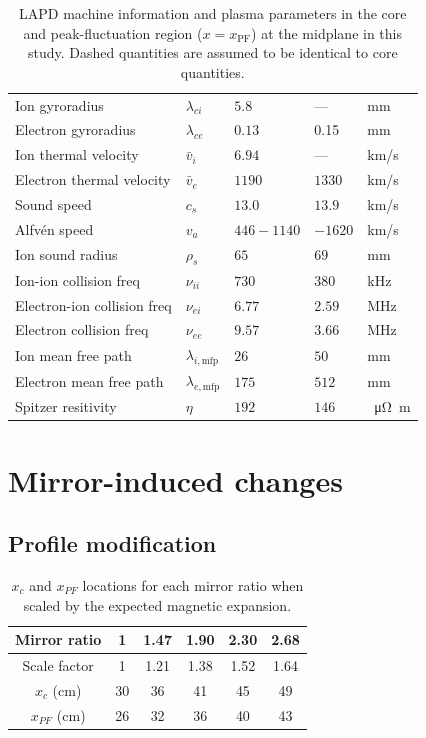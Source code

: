 \begin{table}
\begin{tabular}{l l l l l}
        Ion gyroradius & $\lambda_{ci}$ & $5.8$ & — & mm \\
        Electron gyroradius & $\lambda_{ce}$ & $0.13$ & 0.15 & mm \\
        Ion thermal velocity & $\bar{v}_i$ & $6.94$ & — & km/s\\
        Electron thermal velocity & $\bar{v}_{e}$ & $1190$ & $1330$ & km/s \\
        Sound speed & $c_s$ & $13.0$ & $13.9$ & km/s\\
        Alfvén speed & $v_a$ & $446 - 1140$ & $ - 1620$ & km/s \\
        Ion sound radius & $\rho_s$ & $65$ & $69$ & mm\\
        Ion-ion collision freq & $\nu_{ii}$ & $730$ & $380$ & kHz \\
        Electron-ion collision freq & $\nu_{ei}$ & $6.77$ & $2.59$ & MHz \\
        Electron collision freq & $\nu_{ee}$ & $9.57$ & $3.66$ & MHz \\
        Ion mean free path & $\lambda_{i,\text{mfp}}$ & $26$ & $50$ & mm \\
        Electron mean free path & $\lambda_{e, \text{mfp}}$ & $175$ & $512$ & mm \\
        Spitzer resitivity &  $\eta$ & $192$ & $146$ & \SI{}{\micro \ohm \meter} \\
        
    \end{tabular}
    \caption{LAPD machine information and plasma parameters in the core and peak-fluctuation region ($x=x_\text{PF}$) at the midplane in this study. Dashed quantities are assumed to be identical to core quantities.}
    \label{tab:plasma-parameters}
\end{table}

\section{\label{sec:changes}Mirror-induced changes}

\subsection{Profile modification}

\begin{table}
    \centering
    \begin{tabular}{c c c c c c}
         Mirror ratio & 1 & 1.47 & 1.90 & 2.30 & 2.68 \\
         \hline
         Scale factor & 1 & 1.21 & 1.38 & 1.52 & 1.64\\
         $x_{c}$ (cm) & 30 & 36 & 41 & 45 & 49 \\
         $x_{PF}$ (cm) & 26 & 32 & 36 & 40 & 43 \\
    \end{tabular}
    \caption{$x_c$ and $x_{PF}$ locations for each mirror ratio when scaled by the expected magnetic expansion.}
    \label{tab:x_PF}
\end{table}

